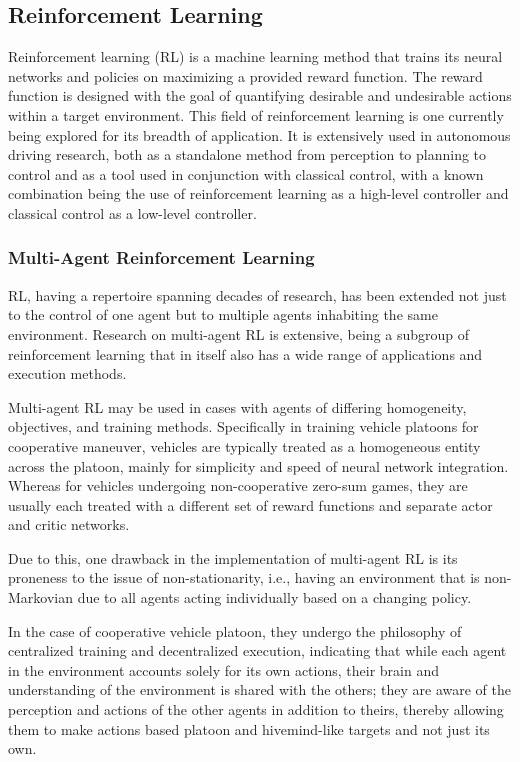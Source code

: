 \documentclass[12pt, a4paper]{report}
\begin{document}
\subsection{Reinforcement Learning}

Reinforcement learning (RL) is a machine learning method that trains its neural networks and policies on maximizing a provided reward function. The reward function is designed with the goal of quantifying desirable and undesirable actions within a target environment. This field of reinforcement learning is one currently being explored for its breadth of application. It is extensively used in autonomous driving research, both as a standalone method from perception to planning to control and as a tool used in conjunction with classical control, with a known combination being the use of reinforcement learning as a high-level controller and classical control as a low-level controller.

\subsubsection{Multi-Agent Reinforcement Learning}

RL, having a repertoire spanning decades of research, has been extended not just to the control of one agent but to multiple agents inhabiting the same environment. Research on multi-agent RL is extensive, being a subgroup of reinforcement learning that in itself also has a wide range of applications and execution methods.

Multi-agent RL may be used in cases with agents of differing homogeneity, objectives, and training methods. Specifically in training vehicle platoons for cooperative maneuver, vehicles are typically treated as a homogeneous entity across the platoon, mainly for simplicity and speed of neural network integration. Whereas for vehicles undergoing non-cooperative zero-sum games, they are usually each treated with a different set of reward functions and separate actor and critic networks.

Due to this, one drawback in the implementation of multi-agent RL is its proneness to the issue of non-stationarity, i.e., having an environment that is non-Markovian due to all agents acting individually based on a changing policy.

In the case of cooperative vehicle platoon, they undergo the philosophy of centralized training and decentralized execution, indicating that while each agent in the environment accounts solely for its own actions, their brain and understanding of the environment is shared with the others; they are aware of the perception and actions of the other agents in addition to theirs, thereby allowing them to make actions based platoon and hivemind-like targets and not just its own.
\end{document}
